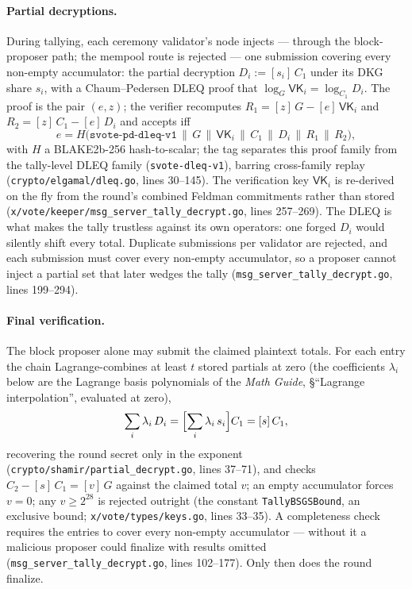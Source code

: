\documentclass[11pt,a4paper]{article}
\theoremstyle{definition}
\begin{document}
\paragraph{Partial decryptions.} During tallying, each ceremony validator's
node injects --- through the block-proposer path; the mempool route is
rejected --- one submission covering every non-empty accumulator: the
partial decryption $D_i := [s_i]\,C_1$ under its DKG share $s_i$, with a
Chaum--Pedersen DLEQ proof that
$\log_G \mathsf{VK}_i = \log_{C_1} D_i$. The proof is the pair $(e, z)$; the
verifier recomputes $R_1 = [z]\,G - [e]\,\mathsf{VK}_i$ and
$R_2 = [z]\,C_1 - [e]\,D_i$ and accepts iff
\[
e = H\bigl(\mathtt{svote\text{-}pd\text{-}dleq\text{-}v1} \,\|\, G \,\|\,
\mathsf{VK}_i \,\|\, C_1 \,\|\, D_i \,\|\, R_1 \,\|\, R_2\bigr),
\]
with $H$ a BLAKE2b-256 hash-to-scalar; the tag separates this proof family
from the tally-level DLEQ family (\texttt{svote-dleq-v1}), barring
cross-family replay (\texttt{crypto/elgamal/dleq.go}, lines 30--145). The
verification key $\mathsf{VK}_i$ is re-derived on the fly from the round's
combined Feldman commitments rather than stored
(\texttt{x/vote/keeper/msg\_server\_tally\_decrypt.go}, lines 257--269).
The DLEQ is what makes the tally trustless against its own operators: one
forged $D_i$ would silently shift every total. Duplicate submissions per
validator are rejected, and each submission must cover every non-empty
accumulator, so a proposer cannot inject a partial set that later wedges the
tally (\texttt{msg\_server\_tally\_decrypt.go}, lines 199--294).

\paragraph{Final verification.} The block proposer alone may submit the
claimed plaintext totals. For each entry the chain Lagrange-combines at
least $t$ stored partials at zero (the coefficients $\lambda_i$ below are
the Lagrange basis polynomials of the \emph{Math Guide}, \S``Lagrange
interpolation'', evaluated at zero),
\[
\sum_i \lambda_i\, D_i = \Bigl[\sum_i \lambda_i\, s_i\Bigr] C_1 =
[s]\,C_1,
\]
recovering the round secret only in the exponent
(\texttt{crypto/shamir/partial\_decrypt.go}, lines 37--71), and checks
$C_2 - [s]\,C_1 = [v]\,G$ against the claimed total $v$; an empty
accumulator forces $v = 0$; any $v \geq 2^{28}$ is rejected outright (the
constant \texttt{TallyBSGSBound}, an exclusive bound;
\texttt{x/vote/types/keys.go}, lines 33--35). A completeness check requires
the entries to cover every non-empty accumulator --- without it a malicious
proposer could finalize with results omitted
(\texttt{msg\_server\_tally\_decrypt.go}, lines 102--177). Only then does
the round finalize.
\end{document}
